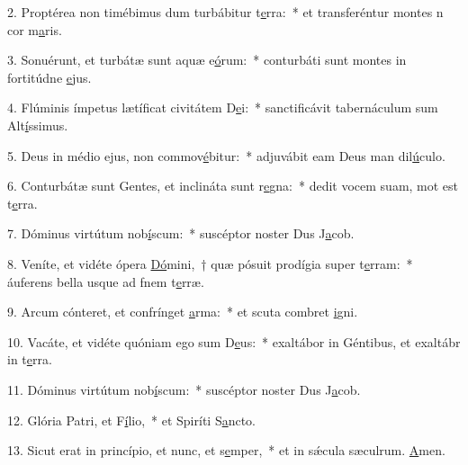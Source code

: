 2. Proptérea non timébimus dum turbábitur t\uline{e}rra:~* et transferéntur montes n cor m\uline{a}ris.\par 
3. Sonuérunt, et turbátæ sunt aquæ e\uline{ó}rum:~* conturbáti sunt montes in fortitúdne \uline{e}jus.\par 
4. Flúminis ímpetus lætíficat civitátem D\uline{e}i:~* sanctificávit tabernáculum sum Alt\uline{í}ssimus.\par 
5. Deus in médio ejus, non commov\uline{é}bitur:~* adjuvábit eam Deus man dil\uline{ú}culo.\par 
6. Conturbátæ sunt Gentes, et inclináta sunt r\uline{e}gna:~* dedit vocem suam, mot est t\uline{e}rra.\par 
7. Dóminus virtútum nob\uline{í}scum:~* suscéptor noster Dus J\uline{a}cob.\par 
8. Veníte, et vidéte ópera \uline{Dó}mini,~† quæ pósuit prodígia super t\uline{e}rram:~* áuferens bella usque ad fnem t\uline{e}rræ.\par 
9. Arcum cónteret, et confrínget \uline{a}rma:~* et scuta combret \uline{i}gni.\par 
10. Vacáte, et vidéte quóniam ego sum D\uline{e}us:~* exaltábor in Géntibus, et exaltábr in t\uline{e}rra.\par 
11. Dóminus virtútum nob\uline{í}scum:~* suscéptor noster Dus J\uline{a}cob.\par 
12. Glória Patri, et F\uline{í}lio,~* et Spiríti S\uline{a}ncto.\par 
13. Sicut erat in princípio, et nunc, et s\uline{e}mper,~* et in sǽcula sæculrum. \uline{A}men.\par 
